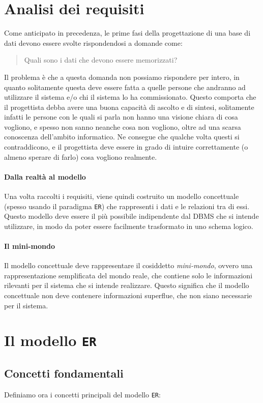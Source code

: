 \section{Analisi dei requisiti}
    Come anticipato in precedenza, le prime fasi della progettazione di una base di dati devono essere svolte rispondendosi a domande come:
    \begin{quote}
        Quali sono i dati che devono essere memorizzati?
    \end{quote}
    Il problema è che a questa domanda non possiamo rispondere per intero, in quanto solitamente questa deve essere fatta a quelle persone che andranno ad utilizzare il sistema e/o chi il sistema lo ha commissionato. Questo comporta che il progettista debba avere una buona capacità di ascolto e di sintesi, solitamente infatti le persone con le quali si parla non hanno una visione chiara di cosa vogliono, e spesso non sanno neanche cosa non vogliono, oltre ad una scarsa conoscenza dell'ambito informatico. Ne consegue che qualche volta questi si contraddicono, e il progettista deve essere in grado di intuire correttamente (o almeno sperare di farlo) cosa vogliono realmente.
    \paragraph{Dalla realtà al modello}
        Una volta raccolti i requisiti, viene quindi costruito un modello concettuale (spesso usando il paradigma \texttt{ER}) che rappresenti i dati e le relazioni tra di essi. Questo modello deve essere il più possibile indipendente dal DBMS che si intende utilizzare, in modo da poter essere facilmente trasformato in uno schema logico.
    \paragraph{Il mini-mondo} 
        Il modello concettuale deve rappresentare il cosiddetto \textit{mini-mondo}, ovvero una rappresentazione semplificata del mondo reale, che contiene solo le informazioni rilevanti per il sistema che si intende realizzare. Questo significa che il modello concettuale non deve contenere informazioni superflue, che non siano necessarie per il sistema.
\section{Il modello \texttt{ER}}
    \subsection{Concetti fondamentali}
        Definiamo ora i concetti principali del modello \texttt{ER}:
